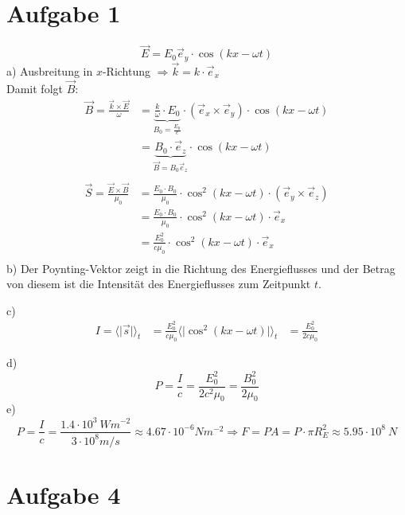 \documentclass[11pt a4paper]{article}
\begin{document}
\thispagestyle{fancy}

\section*{Aufgabe 1}
\[ \vec E = E_0 \vec e_y \cdot \cos(kx - \omega t) \]
a) Ausbreitung in $x$-Richtung $\Rightarrow \vec k = k \cdot \vec e_x $ \\
Damit folgt $\vec B$:
\begin{align*}
	\vec B = \frac{\vec k \times \vec E}{\omega} 
	&= \underbrace{\frac{k}{\omega} \cdot E_0}_{B_0 = \frac{E_0}{c}}
		\cdot (\vec e_x \times \vec e_y) \cdot \cos(kx - \omega t) \\
	&= \underbrace{B_0 \cdot \vec e_z}_{\vec B = B_0 \vec e_z} \cdot \cos(kx - \omega t) \\
\end{align*}
\begin{align*}
	\vec S = \frac{\vec E \times \vec B}{\mu_0}
	&= \frac{E_0 \cdot B_0}{\mu_0} \cdot \cos^2(kx - \omega t) \cdot (\vec e_y \times \vec e_z) \\
	&= \frac{E_0 \cdot B_0}{\mu_0} \cdot \cos^2(kx - \omega t) \cdot \vec e_x \\
	&= \frac{E_0^2}{c \mu_0} \cdot \cos^2(kx - \omega t) \cdot \vec e_x \\
\end{align*}
b) Der Poynting-Vektor zeigt in die Richtung des Energieflusses und der Betrag von diesem ist die Intensität des 
Energieflusses zum Zeitpunkt $t$.

\vspace{0.5cm}
\noindent 
c)
\begin{align*}
	I = \langle \vert \vec s \vert \rangle_t 
	&= \frac{E_0^2}{c\mu_0} \langle \vert \cos^2(kx - \omega t) \vert \rangle_t
	&= \frac{E_0^2}{2c\mu_0}
\end{align*}

\vspace{0.5cm}
\noindent 
d)
\[ P = \frac{I}{c} = \frac{E_0^2}{2c^2\mu_0} = \frac{B_0^2}{2\mu_0} \]
e) 
\[ P = \frac{I}{c} = \frac{1.4 \cdot 10^3 \ Wm^{-2}}{3 \cdot 10^8 m/s} \approx 4.67 \cdot 10^{-6} Nm^{-2} 
\Rightarrow 
F = PA = P \cdot \pi R_E^2 \approx 5.95 \cdot 10^{8} \ N 
\]

\newpage
\setlength{\headheight}{0cm}

\section*{Aufgabe 4}
\end{document}
